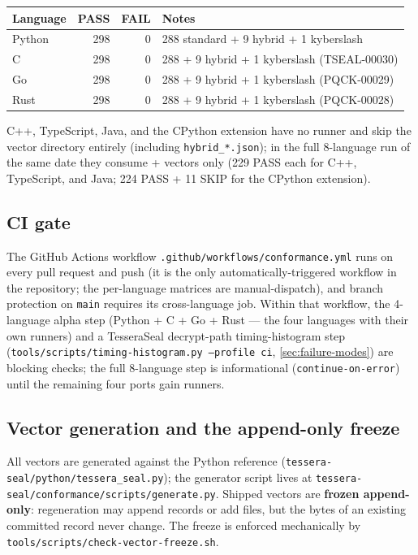 \begin{center}
\small
\begin{tabular}{@{}lrrl@{}}
\toprule
\textbf{Language} & \textbf{PASS} & \textbf{FAIL} & \textbf{Notes} \\
\midrule
Python   & 298 & 0 & 288 standard + 9 hybrid + 1 kyberslash \\
C        & 298 & 0 & 288 + 9 hybrid + 1 kyberslash (TSEAL-00030) \\
Go       & 298 & 0 & 288 + 9 hybrid + 1 kyberslash (PQCK-00029) \\
Rust     & 298 & 0 & 288 + 9 hybrid + 1 kyberslash (PQCK-00028) \\
\bottomrule
\end{tabular}
\end{center}

C++, TypeScript, Java, and the CPython extension have no \pqcrypt{} runner and skip the \pqcrypt{} vector directory entirely (including \texttt{hybrid\_*.json}); in the full 8-language run of the same date they consume \pqid{} + \pqhash{} vectors only (229 PASS each for C++, TypeScript, and Java; 224 PASS + 11 SKIP for the CPython extension).

\subsection{CI gate}

The GitHub Actions workflow \texttt{.github/workflows/conformance.yml} runs on every pull request and push (it is the only automatically-triggered workflow in the repository; the per-language matrices are manual-dispatch), and branch protection on \texttt{main} requires its cross-language job. Within that workflow, the 4-language alpha step (Python + C + Go + Rust --- the four languages with their own \pqcrypt{} runners) and a TesseraSeal decrypt-path timing-histogram step (\texttt{tools/scripts/timing-histogram.py --profile ci}, \cref{sec:failure-modes}) are blocking checks; the full 8-language step is informational (\texttt{continue-on-error}) until the remaining four ports gain \pqcrypt{} runners.

\subsection{Vector generation and the append-only freeze}

All vectors are generated against the Python reference (\texttt{tessera-seal/python/tessera\_seal.py}); the generator script lives at \texttt{tessera-seal/conformance/scripts/generate.py}. Shipped vectors are \textbf{frozen append-only}: regeneration may append records or add files, but the bytes of an existing committed record never change. The freeze is enforced mechanically by \texttt{tools/scripts/check-vector-freeze.sh}.

